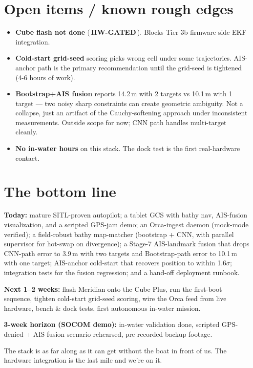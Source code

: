 \documentclass[10pt,a4paper]{article}
\newcommand{\statushardware}{{\color{white}\colorbox{mDim}{\small\bfseries\,HW-GATED\,}}}
\begin{document}
\section{Open items / known rough edges}
\begin{itemize}
\item \textbf{Cube flash not done} (\statushardware). Blocks Tier 3b firmware-side EKF integration.
\item \textbf{Cold-start grid-seed} scoring picks wrong cell under some trajectories. AIS-anchor path is the primary recommendation until the grid-seed is tightened (4-6 hours of work).
\item \textbf{Bootstrap+AIS fusion} reports 14.2\,m with 2 targets vs 10.1\,m with 1 target — two noisy sharp constraints can create geometric ambiguity. Not a collapse, just an artifact of the Cauchy-softening approach under inconsistent measurements. Outside scope for now; CNN path handles multi-target cleanly.
\item \textbf{No in-water hours} on this stack. The dock test is the first real-hardware contact.
\end{itemize}

\section{The bottom line}
\begin{tcolorbox}[colframe=mSafe, colback=white, title=\normalsize What you're signing up for]
\textbf{Today:} mature SITL-proven autopilot; a tablet GCS with bathy nav,
AIS-fusion visualization, and a scripted GPS-jam demo; an Orca-ingest
daemon (mock-mode verified); a field-robust bathy map-matcher (bootstrap
+ CNN, with parallel supervisor for hot-swap on divergence); a
Stage-7 AIS-landmark fusion that drops CNN-path error to 3.9\,m with
two targets and Bootstrap-path error to 10.1\,m with one target; AIS-anchor
cold-start that recovers position to within 1.6$\sigma$; integration
tests for the fusion regression; and a hand-off deployment runbook.

\textbf{Next 1--2 weeks:} flash Meridian onto the Cube Plus, run the
first-boot sequence, tighten cold-start grid-seed scoring, wire the
Orca feed from live hardware, bench \& dock tests, first autonomous
in-water mission.

\textbf{3-week horizon (SOCOM demo):} in-water validation done,
scripted GPS-denied + AIS-fusion scenario rehearsed, pre-recorded
backup footage.

The stack is as far along as it can get without the boat in front of
us. The hardware integration is the last mile and we're on it.
\end{tcolorbox}
\end{document}
